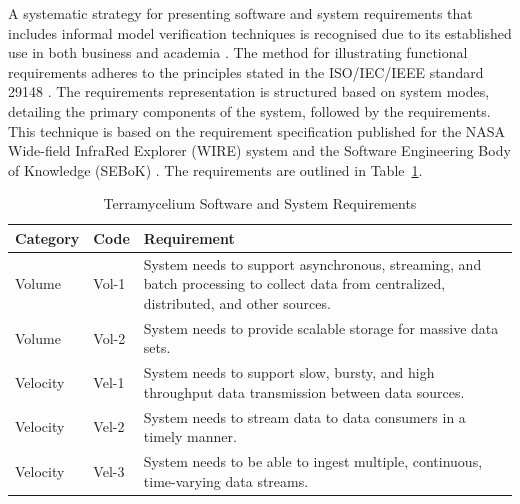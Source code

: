 \documentclass[review]{elsarticle}
\begin{document}
A systematic strategy for presenting software and system requirements that includes informal model verification techniques is recognised due to its established use in both business and academia \cite{kassab2014state}. The method for illustrating functional requirements adheres to the principles stated in the ISO/IEC/IEEE standard 29148 \cite{ISO29148}. The requirements representation is structured based on system modes, detailing the primary components of the system, followed by the requirements. This technique is based on the requirement specification published for the NASA Wide-field InfraRed Explorer (WIRE) system \cite{NASA} and the Software Engineering Body of Knowledge (SEBoK) \cite{abran2004software}. The requirements are outlined in Table~\ref{table:systemRequirements}.

\begin{table}

  \renewcommand{\arraystretch}{1.3}

  \caption{Terramycelium Software and System Requirements}

  \label{table:systemRequirements}

  \centering

  \begin{tabular}{|l|l|p{10cm}|}

  \hline

  \textbf{Category} & \textbf{Code} & \textbf{Requirement} \\

  \hline

  Volume & Vol-1 & System needs to support asynchronous, streaming, and batch processing to collect data from centralized, distributed, and other sources. \\

  \hline

  Volume & Vol-2 & System needs to provide scalable storage for massive data sets. \\

  \hline

  Velocity & Vel-1 & System needs to support slow, bursty, and high throughput data transmission between data sources. \\

  \hline

  Velocity & Vel-2 & System needs to stream data to data consumers in a timely manner. \\

  \hline

  Velocity & Vel-3 & System needs to be able to ingest multiple, continuous, time-varying data streams. \\


\end{tabular}
\end{table}
\end{document}
